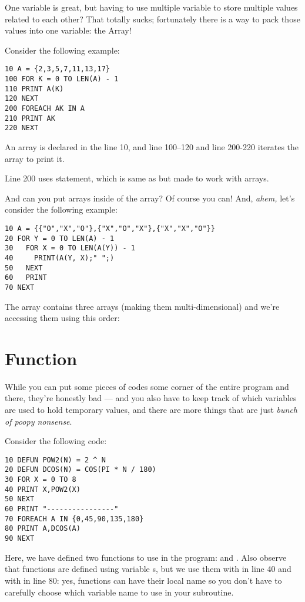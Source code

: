 One variable is great, but having to use multiple variable to store multiple values related to each other? That totally sucks; fortunately there is a way to pack those values into one variable: the Array!

Consider the following example:

\begin{lstlisting}
10 A = {2,3,5,7,11,13,17}
100 FOR K = 0 TO LEN(A) - 1
110 PRINT A(K)
120 NEXT
200 FOREACH AK IN A
210 PRINT AK
220 NEXT
\end{lstlisting}

An array is declared in the line 10, and line 100--120 and line 200-220 iterates the array to print it.

Line 200 uses  statement, which is same as  but made to work with arrays.

And can you put arrays inside of the array? Of course you can! And, \emph{ahem,} let's consider the following example:

\begin{lstlisting}
10 A = {{"O","X","O"},{"X","O","X"},{"X","X","O"}}
20 FOR Y = 0 TO LEN(A) - 1
30   FOR X = 0 TO LEN(A(Y)) - 1
40     PRINT(A(Y, X);" ";)
50   NEXT
60   PRINT
70 NEXT
\end{lstlisting}

The array  contains three arrays (making them multi-dimensional) and we're accessing them using this order: 

\section[Function]{Function}

While you can put some pieces of codes some corner of the entire program and  there, they're honestly bad --- and you also have to keep track of which variables are used to hold temporary values, and there are more things that are just \emph{bunch of poopy nonsense}.

Consider the following code:

\begin{lstlisting}
10 DEFUN POW2(N) = 2 ^ N
20 DEFUN DCOS(N) = COS(PI * N / 180)
30 FOR X = 0 TO 8
40 PRINT X,POW2(X)
50 NEXT
60 PRINT "----------------"
70 FOREACH A IN {0,45,90,135,180}
80 PRINT A,DCOS(A)
90 NEXT
\end{lstlisting}

Here, we have defined two functions to use in the program:  and . Also observe that functions are defined using variable s, but we use them with  in line 40 and with  in line 80: yes, functions can have their local name so you don't have to carefully choose which variable name to use in your subroutine.


